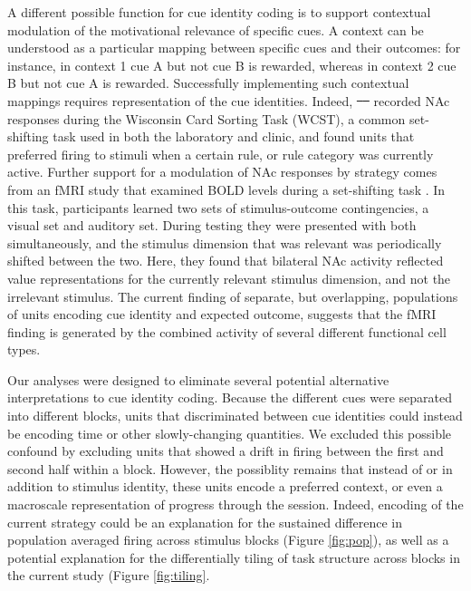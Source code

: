 \documentclass[11pt]{article}
\let\cite=\citep
\let\citeNP=\citealt
\providecommand{\DIFadd}[1]{{\protect\color{blue}\uwave{#1}}} %
\providecommand{\DIFdel}[1]{{\protect\color{red}\sout{#1}}}                      %
\providecommand{\DIFaddbegin}{} %
\providecommand{\DIFaddend}{} %
\providecommand{\DIFdelbegin}{} %
\providecommand{\DIFdelend}{} %
\newcommand{\DIFscaledelfig}{0.5}
\newlength{\DIFdelgraphicswidth} %
\newlength{\DIFdelgraphicsheight} %
\newcommand{\DIFaddincludegraphics}[2][]{{\color{blue}\fbox{\DIFOincludegraphics[#1]{#2}}}} %
\newcommand{\DIFdelincludegraphics}[2][]{%
\sbox{\DIFdelgraphicsbox}{\DIFOincludegraphics[#1]{#2}}%
\settoboxwidth{\DIFdelgraphicswidth}{\DIFdelgraphicsbox} %
\settoboxtotalheight{\DIFdelgraphicsheight}{\DIFdelgraphicsbox} %
\scalebox{\DIFscaledelfig}{%
\parbox[b]{\DIFdelgraphicswidth}{\usebox{\DIFdelgraphicsbox}\\[-\baselineskip] \rule{\DIFdelgraphicswidth}{0em}}\llap{\resizebox{\DIFdelgraphicswidth}{\DIFdelgraphicsheight}{%
\setlength{\unitlength}{\DIFdelgraphicswidth}%
\begin{picture}(1,1)%
\thicklines\linethickness{2pt} %
{\color[rgb]{1,0,0}\put(0,0){\framebox(1,1){}}}%
{\color[rgb]{1,0,0}\put(0,0){\line( 1,1){1}}}%
{\color[rgb]{1,0,0}\put(0,1){\line(1,-1){1}}}%
\end{picture}%
}\hspace*{3pt}}} %
} %
\DeclareRobustCommand{\DIFaddbegin}{\DIFOaddbegin \let\includegraphics\DIFaddincludegraphics} %
\DeclareRobustCommand{\DIFaddend}{\DIFOaddend \let\includegraphics\DIFOincludegraphics} %
\DeclareRobustCommand{\DIFdelbegin}{\DIFOdelbegin \let\includegraphics\DIFdelincludegraphics} %
\DeclareRobustCommand{\DIFdelend}{\DIFOaddend \let\includegraphics\DIFOincludegraphics} %
\begin{document}
A different possible function for cue identity coding is to support
contextual modulation of the motivational relevance of specific
cues. A context can be understood as a particular mapping between
specific cues and their outcomes: for instance, in context 1 cue A but
not cue B is rewarded, whereas in context 2 cue B but not cue A is
rewarded. Successfully implementing such contextual mappings requires
representation of the cue identities. Indeed, \DIFdelbegin \DIFdel{\mbox{%
\cite{Sleezer2016}
}\hspace{0pt}%
}\DIFdelend \DIFaddbegin \DIFadd{\mbox{%
\citeNP{Sleezer2016}
}\hspace{0pt}%
}\DIFaddend recorded NAc responses during the Wisconsin Card Sorting Task (WCST),
a common set-shifting task used in both the laboratory and clinic, and
found units that preferred firing to stimuli when a certain rule, or
rule category was currently active. Further support for a
modulation of NAc responses by strategy comes from an fMRI study that
examined BOLD levels during a set-shifting task
\cite{Fitzgerald2014}. In this task, participants learned two sets of
stimulus-outcome contingencies, a visual set and auditory set. During
testing they were presented with both simultaneously, and the stimulus
dimension that was relevant was periodically shifted between the
two. Here, they found that bilateral NAc activity reflected value
representations for the currently relevant stimulus dimension, and not
the irrelevant stimulus. The current finding of separate, but
overlapping, populations of units encoding cue identity and expected
outcome, suggests that the fMRI finding is generated by the combined
activity of several different functional cell types.

Our analyses were designed to eliminate several potential alternative
interpretations to cue identity coding. Because the different cues
were separated into different blocks, units that discriminated between
cue identities could instead be encoding time or other slowly-changing
quantities. We excluded this possible confound by excluding units that
showed a drift in firing between the first and second half within a
block. However, the possiblity remains that instead of or in addition
to stimulus identity, these units encode a preferred context, or even
a macroscale representation of progress through the session. Indeed,
encoding of the current strategy could be an explanation for the
sustained difference in population averaged firing across stimulus
blocks (Figure \ref{fig:pop}), as well as a potential explanation for
the differentially tiling of task structure across blocks in the
current study (Figure \ref{fig:tiling}\DIFaddbegin \DIFadd{)}\DIFaddend .
\end{document}
